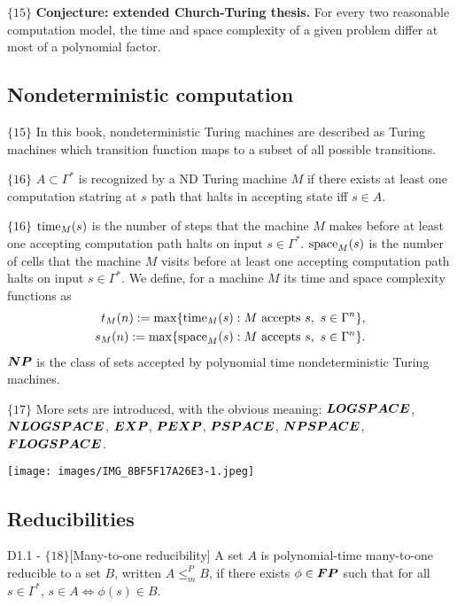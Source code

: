 \documentclass{article}
\begin{document}
$\{15\}$ \textbf{Conjecture: extended Church-Turing thesis.} For every two reasonable computation model, the time and space complexity of a given problem differ at most of a polynomial factor.


\subsection{Nondeterministic computation}

$\{15\}$ In this book, nondeterministic Turing machines are described as Turing machines which transition function maps to a subset of all possible transitions.

$\{16\}$ $A \subset \Gamma^\ast$ is recognized by a ND Turing machine $M$ if there exists at least one computation statring at $s$ path that halts in accepting state iff $s \in A$.

$\{16\}$ $\operatorname{time}_M(s)$ is the number of steps that the machine $M$ makes before at least one accepting computation path halts on input $s \in \Gamma^\ast$. $\operatorname{space}_M(s)$ is the number of cells that the machine $M$ visits before at least one accepting computation path halts on input $s \in \Gamma^\ast$. We define, for a machine $M$ its time and space complexity functions as 
\begin{align}
    t_M(n) := \max \{\operatorname{time}_M(s) : M \text{ accepts } s, \ s \in \Gamma^n \},\\
    s_M(n) := \max \{\operatorname{space}_M(s) : M \text{ accepts } s, \ s \in \Gamma^n \}.
\end{align}
$\boldsymbol{NP}$ is the class of sets accepted by polynomial time nondeterministic Turing machines.

$\{17\}$ More sets are introduced, with the obvious meaning: $\boldsymbol{LOGSPACE}$, $\boldsymbol{NLOGSPACE}$, $\boldsymbol{EXP}$, $\boldsymbol{PEXP}$, $\boldsymbol{PSPACE}$, $\boldsymbol{NPSPACE}$, $\boldsymbol{FLOGSPACE}$.
\begin{center}
    \texttt{[image: images/IMG\_8BF5F17A26E3-1.jpeg]}
\end{center}

\subsection{Reducibilities}

\begin{flexidefinition}{D1.1 - $\{18\}$}[Many-to-one reducibility]
    A set $A$ is polynomial-time many-to-one reducible to a set $B$, written $A \leq_m^P B$, if there exists $\phi \in \boldsymbol{FP}$ such that for all $s \in \Gamma^\ast$, $s \in A \iff \phi(s) \in B$.
\end{flexidefinition} 
\end{document}
